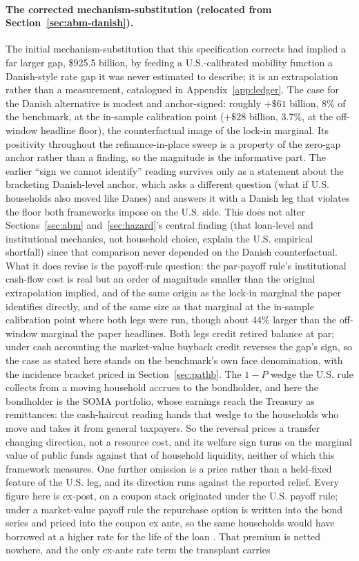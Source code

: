 \documentclass[12pt]{article}
\begin{document}
\paragraph{The corrected mechanism-substitution (relocated from Section~\ref{sec:abm-danish}).}
The initial mechanism-substitution that this specification corrects had implied a far larger gap, \$925.5 billion, by feeding a U.S.-calibrated mobility function a Danish-style rate gap it was never estimated to describe; it is an extrapolation rather than a measurement, catalogued in Appendix~\ref{app:ledger}. The case for the Danish alternative is modest and anchor-signed: roughly $+\$61$ billion, 8\% of the benchmark, at the in-sample calibration point ($+\$28$ billion, 3.7\%, at the off-window headline floor), the counterfactual image of the lock-in marginal. Its positivity throughout the refinance-in-place sweep is a property of the zero-gap anchor rather than a finding, so the magnitude is the informative part. The earlier ``sign we cannot identify'' reading survives only as a statement about the bracketing Danish-level anchor, which asks a different question (what if U.S. households also moved like Danes) and answers it with a Danish leg that violates the floor both frameworks impose on the U.S. side. This does not alter Sections~\ref{sec:abm} and~\ref{sec:hazard}'s central finding (that loan-level and institutional mechanics, not household choice, explain the U.S. empirical shortfall) since that comparison never depended on the Danish counterfactual. What it does revise is the payoff-rule question: the par-payoff rule's institutional cash-flow cost is real but an order of magnitude smaller than the original extrapolation implied, and of the same origin as the lock-in marginal the paper identifies directly, and of the same size as that marginal at the in-sample calibration point where both legs were run, though about 44\% larger than the off-window marginal the paper headlines. Both legs credit retired balance at par; under cash accounting the market-value buyback credit reverses the gap's sign, so the case as stated here stands on the benchmark's own face denomination, with the incidence bracket priced in Section~\ref{sec:pathb}. The $1-P$ wedge the U.S. rule collects from a moving household accrues to the bondholder, and here the bondholder is the SOMA portfolio, whose earnings reach the Treasury as remittances: the cash-haircut reading hands that wedge to the households who move and takes it from general taxpayers. So the reversal prices a transfer changing direction, not a resource cost, and its welfare sign turns on the marginal value of public funds against that of household liquidity, neither of which this framework measures. One further omission is a price rather than a held-fixed feature of the U.S. leg, and its direction runs against the reported relief. Every figure here is ex-post, on a coupon stack originated under the U.S. payoff rule; under a market-value payoff rule the repurchase option is written into the bond series and priced into the coupon ex ante, so the same households would have borrowed at a higher rate for the life of the loan \citep{campbell2013,berg2018}. That premium is netted nowhere, and the only ex-ante rate term the transplant carries 
\end{document}
